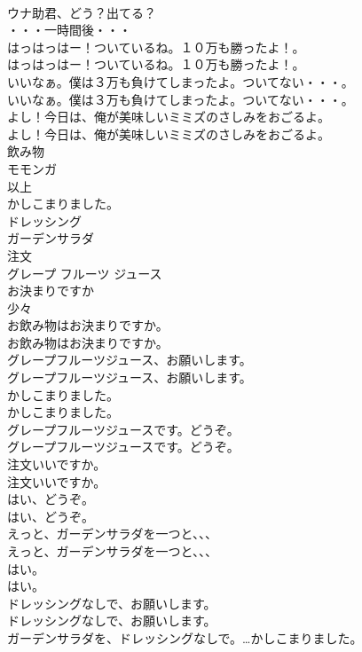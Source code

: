 \documentclass[8pt]{extreport}
\begin{document}
\begin{CJK}{UTF8}{min}
\\	ウナ助君、どう？出てる？ 
\\	・・・一時間後・・・	
\\	はっはっはー！ついているね。１０万も勝ったよ！。	
\\	はっはっはー！ついているね。１０万も勝ったよ！。 
\\	いいなぁ。僕は３万も負けてしまったよ。ついてない・・・。	
\\	いいなぁ。僕は３万も負けてしまったよ。ついてない・・・。 
\\	よし！今日は、俺が美味しいミミズのさしみをおごるよ。	
\\	よし！今日は、俺が美味しいミミズのさしみをおごるよ。 
\\	飲み物
\\	モモンガ
\\	以上
\\	かしこまりました。
\\	ドレッシング
\\	ガーデンサラダ
\\	注文
\\	グレープ フルーツ ジュース
\\	お決まりですか
\\	少々
\\	お飲み物はお決まりですか。	
\\	お飲み物はお決まりですか。 
\\	グレープフルーツジュース、お願いします。	
\\	グレープフルーツジュース、お願いします。 
\\	かしこまりました。	
\\	かしこまりました。 
\\	グレープフルーツジュースです。どうぞ。	
\\	グレープフルーツジュースです。どうぞ。 
\\	注文いいですか。	
\\	注文いいですか。 
\\	はい、どうぞ。	
\\	はい、どうぞ。 
\\	えっと、ガーデンサラダを一つと、、、	
\\	えっと、ガーデンサラダを一つと、、、 
\\	はい。	
\\	はい。 
\\	ドレッシングなしで、お願いします。	
\\	ドレッシングなしで、お願いします。 
\\	ガーデンサラダを、ドレッシングなしで。…かしこまりました。	

\end{CJK}
\end{document}
